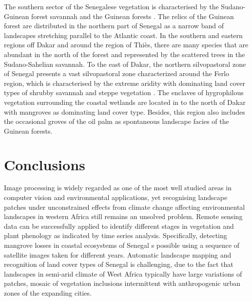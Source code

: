 \documentclass[earth,article,submit,pdftex,moreauthors]{Definitions/mdpi}
\begin{document}
The southern sector of the Senegalese vegetation is characterised by the Sudano-Guinean forest savannah and the Guinean forests \cite{Robequain}. The relics of the Guinean forest are distributed in the northern part of Senegal as a narrow band of landscapes stretching parallel to the Atlantic coast. In the southern and eastern regions off Dakar and around the region of Thiès, there are many species that are abundant in the north of the forest and represented by the scattered trees in the Sudano-Sahelian savannah. To the east of Dakar, the northern silvopastoral zone of Senegal presents a vast silvopastoral zone characterized around the Ferlo region, which is characterised by the extreme aridity with dominating land cover types of shrubby savannah and steppe vegetation \cite{land10070755}. The enclaves of hygrophilous vegetation surrounding the coastal wetlands are located in to the north of Dakar with mangroves as dominating land cover type. Besides, this region also includes the occasional groves of the oil palm as spontaneous landscape facies of the Guinean forests.

\section{Conclusions}

Image processing is widely regarded as one of the most well studied areas in computer vision and environmental applications, yet recognising landscape patches under unconstrained effects from climate change affecting environmental landscapes in western Africa still remains an unsolved problem. Remote sensing data can be successfully applied to identify different stages in vegetation and plant phenology as indicated by time series analysis. Specifically, detecting mangrove losses in coastal ecosystems of Senegal s possible using a sequence of satellite images taken for different years. Automatic landscape mapping and recognition of land cover types of Senegal is challenging, due to the fact that landscapes in semi-arid climate of West Africa typically have large variations of patches, mosaic of vegetation inclusions intermittent with anthropogenic urban zones of the expanding cities.
\end{document}
